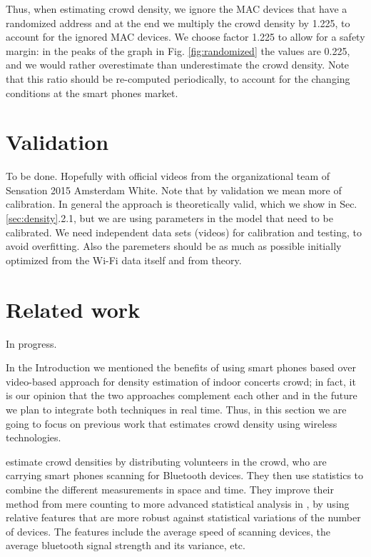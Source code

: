 \documentclass[10pt,a4paper]{article}
\begin{document}
\noindent Thus, when estimating crowd density, we ignore the MAC devices that have a randomized address and at the end we multiply the crowd density by 1.225, to account for the ignored MAC devices. We choose factor 1.225 to allow for a safety margin: in the peaks of the graph in Fig. \ref{fig:randomized} the values are 0.225, and we would rather overestimate than underestimate the crowd density. 
Note that this ratio should be re-computed periodically, to account for the changing conditions at the smart phones market. 



\section{Validation}\label{sec:validation}
To be done.
Hopefully with official videos from the organizational team of  Sensation 2015 Amsterdam White.
Note that by validation we mean more of calibration. In general the approach is theoretically valid, which we show in Sec.\ref{sec:density}.2.1, but we are using parameters in the model that need to be calibrated. We need independent data sets (videos) for calibration and testing, to avoid overfitting. Also the paremeters should be as much as possible initially optimized from the Wi-Fi data itself and from theory.

\section{Related work}\label{sec:relatedwork}
In progress. 

In the Introduction we mentioned the benefits of using smart phones based over video-based approach for density estimation of indoor concerts crowd; in fact, it is our opinion that the two approaches complement each other and in the future we plan to integrate both techniques in real time. Thus, in this section we are going to focus on previous work that estimates crowd density using wireless technologies. 

\cite{weppner:1} estimate crowd densities by distributing volunteers in the crowd, who are carrying smart phones scanning for Bluetooth devices. They then use statistics to combine the different measurements in space and time. They improve their method from mere counting to more advanced statistical analysis in \cite{weppner:2}, by using relative features that are more robust
against statistical variations of the number of devices. The features include 
the average speed of scanning devices, the average bluetooth signal strength and its variance, etc.
\end{document}
